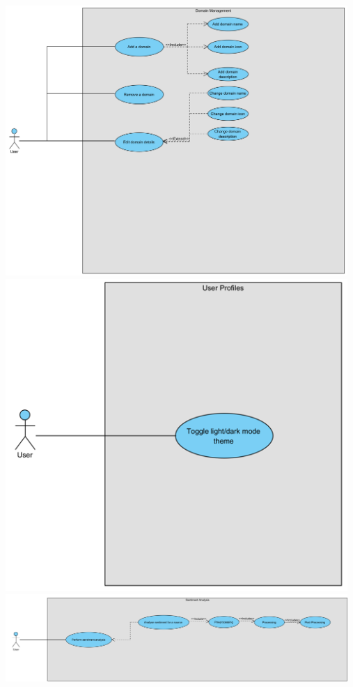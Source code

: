 \documentclass[12pt]{article}
\begin{document}
\begin{center}
  \includegraphics[width=13cm]{../../Images/UC2.2.3.png}
  \includegraphics[width=13cm]{../../Images/UC2.2.4.png}
  \includegraphics[width=13cm]{../../Images/UC2.2.5.png}
\end{center}
\end{document}
